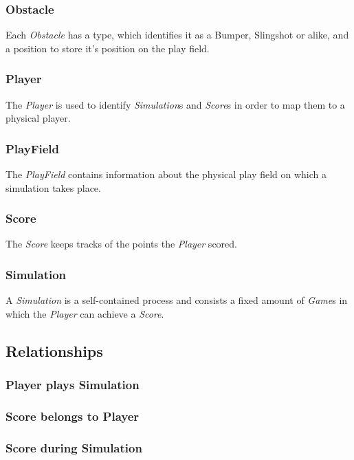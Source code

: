 \documentclass[fontsize=12pt,
               paper=a4,
               twoside=false,
               parskip=half,
               ]{scrartcl}
\begin{document}
\subsubsection{Obstacle}
Each \emph{Obstacle} has a type, which identifies it as a Bumper, Slingshot or alike, and a position to store it's position on the play field.

\subsubsection{Player}
The \emph{Player} is used to identify \emph{Simulation}s and \emph{Score}s in order to map them to a physical player.

\subsubsection{PlayField}
The \emph{PlayField} contains information about the physical play field on which a simulation takes place.

\subsubsection{Score}
The \emph{Score} keeps tracks of the points the \emph{Player} scored.

\subsubsection{Simulation}
A \emph{Simulation} is a self-contained process and consists a fixed amount of \emph{Game}s in which the \emph{Player} can achieve a \emph{Score}. 


\subsection{Relationships}

\subsubsection{Player plays Simulation}

\subsubsection{Score belongs to Player}

\subsubsection{Score during Simulation}
\end{document}
